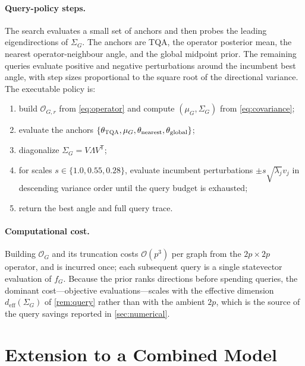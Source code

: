 \documentclass[aps,prxquantum,reprint,amsmath,amssymb,floatfix,nofootinbib,superscriptaddress,longbibliography]{revtex4-2}
\theoremstyle{remark}
\newcommand{\TQA}{\textnormal{\textsc{TQA}}}
\newcommand{\calO}{\mathcal{O}}
\begin{document}
\paragraph{Query-policy steps.}
The search evaluates a small set of anchors and then probes the leading
eigendirections of \(\Sigma_G\).  The anchors are \TQA{}, the operator posterior
mean, the nearest operator-neighbour angle, and the global midpoint prior.  The
remaining queries evaluate positive and negative perturbations around the
incumbent best angle, with step sizes proportional to the square root of the
directional variance.  The executable policy is:
\begin{enumerate}
    \item build \(\calO_{G,r}\) from \cref{eq:operator} and compute
    \((\mu_G,\Sigma_G)\) from \cref{eq:covariance};
    \item evaluate the anchors
    \(\{\theta_{\TQA},\mu_G,\theta_{\mathrm{nearest}},\theta_{\mathrm{global}}\}\);
    \item diagonalize \(\Sigma_G=V\Lambda V^{\mathsf T}\);
    \item for scales \(s\in\{1.0,0.55,0.28\}\), evaluate incumbent perturbations
    \(\pm s\sqrt{\lambda_j}v_j\) in descending variance order until the query
    budget is exhausted;
    \item return the best angle and full query trace.
\end{enumerate}

\paragraph{Computational cost.}
Building \(\calO_G\) and its truncation costs \(\mathcal O(p^3)\) per graph from
the \(2p\times2p\) operator, and is incurred once; each subsequent query is a
single statevector evaluation of \(f_G\).  Because the prior ranks directions
before spending queries, the dominant cost---objective evaluations---scales with
the effective dimension \(d_{\mathrm{eff}}(\Sigma_G)\) of \cref{rem:query} rather
than with the ambient \(2p\), which is the source of the query savings reported in
\cref{sec:numerical}.

\section{Extension to a Combined Model}
\label{sec:combined}
\end{document}
